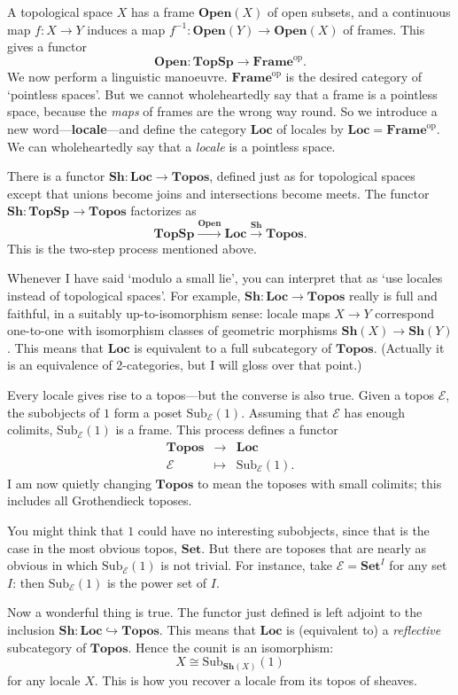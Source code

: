 \documentclass[12pt]{article}
\newcommand{\cat}[1]{\mathscr{#1}}
\newcommand{\fcat}[1]{\mathbf{#1}}
\newcommand{\op}{\mathrm{op}}
\newcommand{\Set}{\fcat{Set}}
\newcommand{\goesto}{\mapsto}
\newcommand{\demph}[1]{\textbf{\textup{#1}}}
\newcommand{\iso}{\cong}
\newcommand{\E}{\cat{E}}
\newcommand{\Sub}{\mathrm{Sub}}
\newcommand{\toby}[1]{\stackrel{#1}{\to}}
\newcommand{\Sh}{\fcat{Sh}}
\newcommand{\Open}{\fcat{Open}}
\newcommand{\TopSp}{\fcat{TopSp}}
\newcommand{\Topos}{\fcat{Topos}}
\newcommand{\Frame}{\fcat{Frame}}
\newcommand{\Loc}{\fcat{Loc}}
\newcommand{\incl}{\hookrightarrow}
\newcommand{\cln}{\colon}
\begin{document}
A topological space $X$ has a frame $\Open(X)$ of open subsets, and a
continuous map $f\cln X \to Y$ induces a map $f^{-1}\cln \Open(Y) \to
\Open(X)$ of frames.  This gives a functor
\[
\Open\cln \TopSp \to \Frame^\op.
\]
We now perform a linguistic manoeuvre.  $\Frame^\op$ is the desired category
of `pointless spaces'.  But we cannot wholeheartedly say that a frame is a
pointless space, because the \emph{maps} of frames are the wrong way round.
So we introduce a new word---\demph{locale}---and define the category $\Loc$
of locales by $\Loc = \Frame^\op$.  We can wholeheartedly say that a
\emph{locale} is a pointless space.

There is a functor $\Sh\cln \Loc \to \Topos$, defined just as for topological
spaces except that unions become joins and intersections become meets.  The
functor $\Sh\cln \TopSp \to \Topos$ factorizes as
\[
\TopSp \toby{\Open} \Loc \toby{\Sh} \Topos.
\]
This is the two-step process mentioned above.

Whenever I have said `modulo a small lie', you can interpret that as `use
locales instead of topological spaces'.  For example, $\Sh\cln \Loc \to
\Topos$ really is full and faithful, in a suitably up-to-isomorphism sense:
locale maps $X \to Y$ correspond one-to-one with isomorphism classes of
geometric morphisms $\Sh(X) \to \Sh(Y)$.  This means that $\Loc$ is equivalent
to a full subcategory of $\Topos$.  (Actually it is an equivalence of
2-categories, but I will gloss over that point.)

Every locale gives rise to a topos---but the converse is also true.  Given a
topos $\E$, the subobjects of $1$ form a poset $\Sub_\E(1)$.  Assuming that
$\E$ has enough colimits, $\Sub_\E(1)$ is a frame.  This process defines a
functor
\[
\begin{array}{ccc}
\Topos  &\to            &\Loc           \\
\E      &\goesto        &\Sub_\E(1).
\end{array}
\]
I am now quietly changing $\Topos$ to mean the toposes with small colimits;
this includes all Grothendieck toposes.

You might think that $1$ could have no interesting subobjects, since that is
the case in the most obvious topos, $\Set$.  But there are toposes that are
nearly as obvious in which $\Sub_\E(1)$ is not trivial.  For instance, take
$\E = \Set^I$ for any set $I$: then $\Sub_\E(1)$ is the power set of $I$.

Now a wonderful thing is true.  The functor just defined is left adjoint to
the inclusion $\Sh\cln \Loc \incl \Topos$.  This means that $\Loc$ is
(equivalent to) a \emph{reflective} subcategory of $\Topos$.  Hence the counit
is an isomorphism:
\[
X \iso \Sub_{\Sh(X)}(1)
\]
for any locale $X$.  This is how you recover a locale from its topos of
sheaves.
\end{document}
